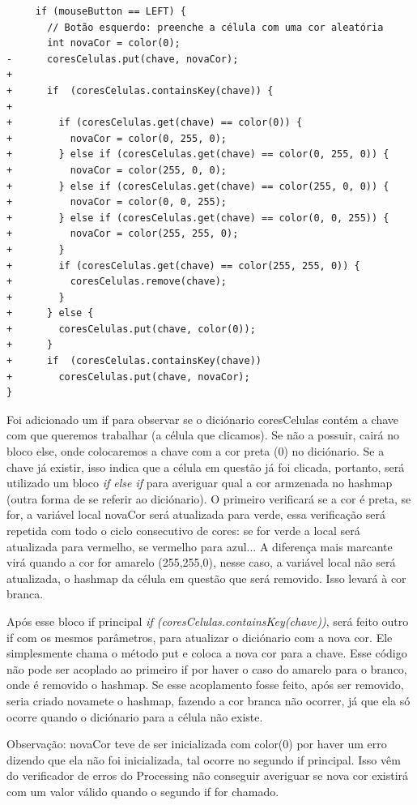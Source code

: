 \documentclass[
	12pt,				%
	oneside,			%
	a4paper,			%
	english,			%
	brazil,				%
	]{abntex2}
\begin{document}
{\begin{verbatim}
     if (mouseButton == LEFT) {
       // Botão esquerdo: preenche a célula com uma cor aleatória
       int novaCor = color(0);
-      coresCelulas.put(chave, novaCor);
+
+      if  (coresCelulas.containsKey(chave)) {
+
+        if (coresCelulas.get(chave) == color(0)) {
+          novaCor = color(0, 255, 0);
+        } else if (coresCelulas.get(chave) == color(0, 255, 0)) {
+          novaCor = color(255, 0, 0);
+        } else if (coresCelulas.get(chave) == color(255, 0, 0)) {
+          novaCor = color(0, 0, 255);
+        } else if (coresCelulas.get(chave) == color(0, 0, 255)) {
+          novaCor = color(255, 255, 0);
+        }
+        if (coresCelulas.get(chave) == color(255, 255, 0)) {
+          coresCelulas.remove(chave);
+        }
+      } else {
+        coresCelulas.put(chave, color(0));
+      }
+      if  (coresCelulas.containsKey(chave))
+        coresCelulas.put(chave, novaCor);
}
\end{verbatim}

Foi adicionado um if para observar se o diciónario coresCelulas contém a chave com que queremos trabalhar (a célula que clicamos). Se não a possuir, cairá no bloco else, onde colocaremos a chave com a cor preta (0) no diciónario. Se a chave já existir, isso indica que a célula em questão já foi clicada, portanto, será utilizado um bloco \textit{if else if} para averiguar qual a cor armzenada no hashmap (outra forma de se referir ao diciónario). O primeiro verificará se a cor é preta, se for, a variável local novaCor será atualizada para verde, essa verificação será repetida com todo o ciclo consecutivo de cores: se for verde a local será atualizada para vermelho, se vermelho para azul... A diferença mais marcante virá quando a cor for amarelo (255,255,0), nesse caso, a variável local não será atualizada, o hashmap da célula em questão que será removido. Isso levará à cor branca.

Após esse bloco if principal \textit{if  (coresCelulas.containsKey(chave))}, será feito outro if com os mesmos parâmetros, para atualizar o diciónario com a nova cor. Ele simplesmente chama o método put e coloca a nova cor para a chave. Esse código não pode ser acoplado ao primeiro if por haver o caso do amarelo para o branco, onde é removido o hashmap. Se esse acoplamento fosse feito, após ser removido, seria criado novamete o hashmap, fazendo a cor branca não ocorrer, já que ela só ocorre quando o diciónario para a célula não existe.

Observação: novaCor teve de ser inicializada com color(0) por haver um erro dizendo que ela não foi inicializada, tal ocorre no segundo if principal. Isso vêm do verificador de erros do Processing não conseguir averiguar se nova cor existirá com um valor válido quando o segundo if for chamado.

}
\end{document}
